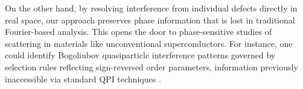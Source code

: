 On the other hand, by resolving interference from individual defects directly in real space, our approach preserves phase information that is lost in traditional Fourier-based analysis. This opens the door to phase-sensitive studies of scattering in materials like unconventional superconductors. For instance, one could identify Bogoliubov quasiparticle interference patterns governed by selection rules reflecting sign-reversed order parameters, information previously inaccessible via standard QPI techniques \cite{chiSignInversionSuperconducting2014}.
